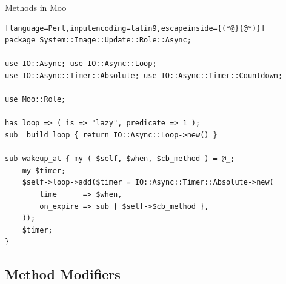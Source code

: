 \documentclass[ngerman,xcolor={table,dvipsnames},smaller,compress,hyperref={bookmarks,colorlinks}]{beamer}%
\begin{document}
\begin{frame}[t,fragile]

\begin{block}{Methods in Moo}
\scriptsize
\begin{lstlisting}[language=Perl,inputencoding=latin9,escapeinside={(*@}{@*)}]
package System::Image::Update::Role::Async;

use IO::Async; use IO::Async::Loop;
use IO::Async::Timer::Absolute; use IO::Async::Timer::Countdown;

use Moo::Role;

has loop => ( is => "lazy", predicate => 1 );
sub _build_loop { return IO::Async::Loop->new() }

sub wakeup_at { my ( $self, $when, $cb_method ) = @_;
    my $timer;
    $self->loop->add($timer = IO::Async::Timer::Absolute->new(
        time      => $when,
        on_expire => sub { $self->$cb_method },
    ));
    $timer;
}
\end{lstlisting}
\end{block}


\end{frame}

\subsection{Method Modifiers}
\end{document}
